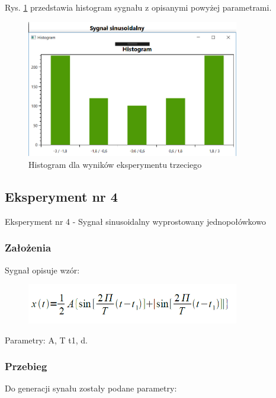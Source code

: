 \documentclass[12pt]{article}
\begin{document}
\newpage
Rys. \ref{Histogram dla wyników eksperymentu trzeciego} przedstawia histogram sygnału z opisanymi powyżej parametrami. 
\begin{figure}[h!]
 \centering
 \includegraphics[width=9.3cm]{SinHist.PNG}
 \vspace{-0.3cm}
 \caption{Histogram dla wyników eksperymentu trzeciego}
 \label{Histogram dla wyników eksperymentu trzeciego}
\end{figure}


\subsection{Eksperyment nr 4}

Eksperyment nr 4 - Sygnał sinusoidalny wyprostowany jednopołówkowo\\

\subsubsection{Założenia}
Sygnał opisuje wzór:
\begin{figure}[h!]
 \centering
 \includegraphics[width=9.3cm]{SinJedPWzor.PNG}
 \vspace{-0.3cm}
 \label{gw}
\end{figure}
\newpage
Parametry: A, T t1, d.

\subsubsection{Przebieg}
Do generacji synału zostały podane parametry:
\end{document}
